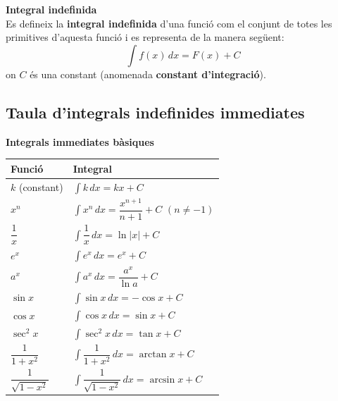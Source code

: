 \documentclass[12pt]{article}
\begin{document}
\begin{concept}
\textbf{Integral indefinida}\\
Es defineix la \textbf{integral indefinida} d'una funció com el conjunt de totes les primitives d'aquesta funció i es representa de la manera següent:
\[
\boxed{\int f(x)\,dx = F(x) + C}
\]
on $C$ és una constant (anomenada \textbf{constant d'integració}).
\end{concept}

\subsection{Taula d'integrals indefinides immediates}

\begin{concept}
\textbf{Integrals immediates bàsiques}

\vspace{0.3cm}

\renewcommand{\arraystretch}{1.4}
\begin{center}
\begin{tabular}{|l|l|}
\hline
\textbf{Funció} & \textbf{Integral} \\
\hline
$k$ (constant) & $\displaystyle \int k\,dx = kx + C$ \\
$x^n$ & $\displaystyle \int x^n\,dx = \dfrac{x^{n+1}}{n+1} + C$ \quad $(n\neq -1)$ \\
$\dfrac{1}{x}$ & $\displaystyle \int \dfrac{1}{x}\,dx = \ln|x| + C$ \\
$e^x$ & $\displaystyle \int e^x\,dx = e^x + C$ \\
$a^x$ & $\displaystyle \int a^x\,dx = \dfrac{a^x}{\ln a} + C$ \\
$\sin x$ & $\displaystyle \int \sin x\,dx = -\cos x + C$ \\
$\cos x$ & $\displaystyle \int \cos x\,dx = \sin x + C$ \\
$\sec^2 x$ & $\displaystyle \int \sec^2 x\,dx = \tan x + C$ \\
$\dfrac{1}{1+x^2}$ & $\displaystyle \int \dfrac{1}{1+x^2}\,dx = \arctan x + C$ \\
$\dfrac{1}{\sqrt{1-x^2}}$ & $\displaystyle \int \dfrac{1}{\sqrt{1-x^2}}\,dx = \arcsin x + C$ \\
\hline
\end{tabular}
\end{center}
\end{concept}
\end{document}
